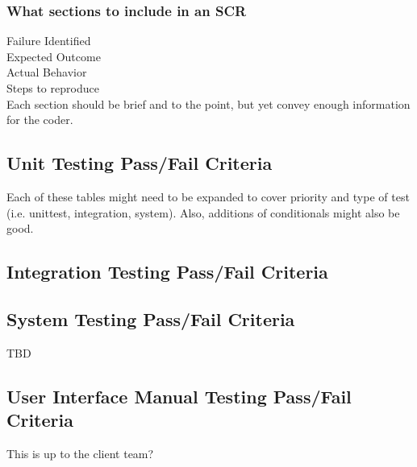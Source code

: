 \documentclass[report]{article}
\begin{document}
\subsubsection{What sections to include in an SCR}

Failure Identified\\
Expected Outcome \\
Actual Behavior \\
Steps to reproduce \\

Each section should be brief and to the point, but yet convey enough information for the coder.

\subsection{Unit Testing Pass/Fail Criteria}
Each of these tables might need to be expanded to cover priority and type of test (i.e. unittest, integration, system). Also, additions of conditionals might also be good.

%

\newpage

\subsection{Integration Testing Pass/Fail Criteria}

%
%
%
%
%
%
%
%
%
%



\subsection{System Testing Pass/Fail Criteria}
TBD
%

\subsection{User Interface Manual Testing Pass/Fail Criteria}
This is up to the client team?
%
\end{document}
